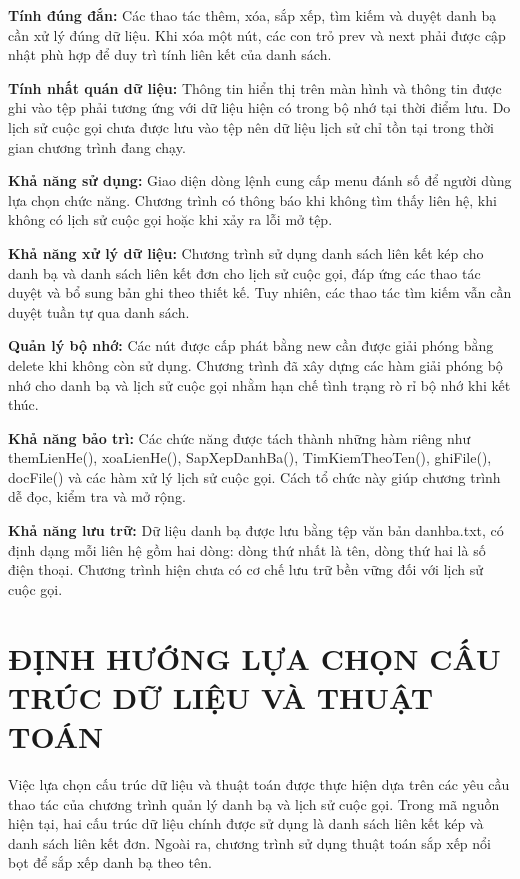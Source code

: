 \documentclass[12pt,a4paper]{report}
\begin{document}
\noindent\textbf{Tính đúng đắn:} Các thao tác thêm, xóa, sắp xếp, tìm kiếm và duyệt danh bạ cần xử lý đúng dữ liệu. Khi xóa một nút, các con trỏ prev và next phải được cập nhật phù hợp để duy trì tính liên kết của danh sách.\par
\noindent\textbf{Tính nhất quán dữ liệu:} Thông tin hiển thị trên màn hình và thông tin được ghi vào tệp phải tương ứng với dữ liệu hiện có trong bộ nhớ tại thời điểm lưu. Do lịch sử cuộc gọi chưa được lưu vào tệp nên dữ liệu lịch sử chỉ tồn tại trong thời gian chương trình đang chạy.\par
\noindent\textbf{Khả năng sử dụng:} Giao diện dòng lệnh cung cấp menu đánh số để người dùng lựa chọn chức năng. Chương trình có thông báo khi không tìm thấy liên hệ, khi không có lịch sử cuộc gọi hoặc khi xảy ra lỗi mở tệp.\par
\noindent\textbf{Khả năng xử lý dữ liệu:} Chương trình sử dụng danh sách liên kết kép cho danh bạ và danh sách liên kết đơn cho lịch sử cuộc gọi, đáp ứng các thao tác duyệt và bổ sung bản ghi theo thiết kế. Tuy nhiên, các thao tác tìm kiếm vẫn cần duyệt tuần tự qua danh sách.\par
\noindent\textbf{Quản lý bộ nhớ:} Các nút được cấp phát bằng new cần được giải phóng bằng delete khi không còn sử dụng. Chương trình đã xây dựng các hàm giải phóng bộ nhớ cho danh bạ và lịch sử cuộc gọi nhằm hạn chế tình trạng rò rỉ bộ nhớ khi kết thúc.\par
\noindent\textbf{Khả năng bảo trì:} Các chức năng được tách thành những hàm riêng như themLienHe(), xoaLienHe(), SapXepDanhBa(), TimKiemTheoTen(), ghiFile(), docFile() và các hàm xử lý lịch sử cuộc gọi. Cách tổ chức này giúp chương trình dễ đọc, kiểm tra và mở rộng.\par
\noindent\textbf{Khả năng lưu trữ:} Dữ liệu danh bạ được lưu bằng tệp văn bản danhba.txt, có định dạng mỗi liên hệ gồm hai dòng: dòng thứ nhất là tên, dòng thứ hai là số điện thoại. Chương trình hiện chưa có cơ chế lưu trữ bền vững đối với lịch sử cuộc gọi.\par
\section{ĐỊNH HƯỚNG LỰA CHỌN CẤU TRÚC DỮ LIỆU VÀ THUẬT TOÁN}

Việc lựa chọn cấu trúc dữ liệu và thuật toán được thực hiện dựa trên các yêu cầu thao tác của chương trình quản lý danh bạ và lịch sử cuộc gọi. Trong mã nguồn hiện tại, hai cấu trúc dữ liệu chính được sử dụng là danh sách liên kết kép và danh sách liên kết đơn. Ngoài ra, chương trình sử dụng thuật toán sắp xếp nổi bọt để sắp xếp danh bạ theo tên.\par
\end{document}
